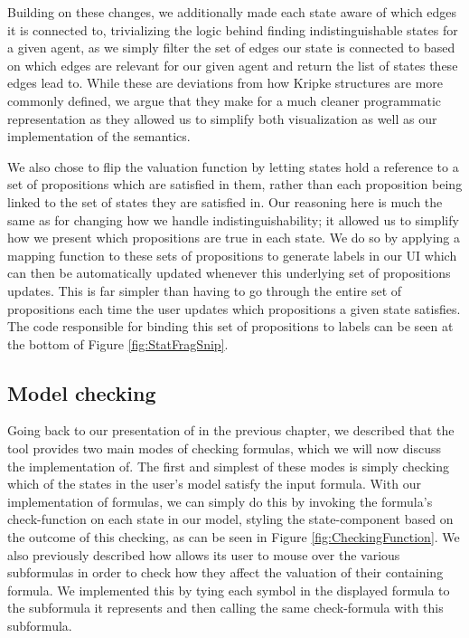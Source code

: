 Building on these changes, we additionally made each state aware of which edges it is connected to, trivializing the logic behind finding indistinguishable states for a given agent, as we simply filter the set of edges our state is connected to based on which edges are relevant for our given agent and return the list of states these edges lead to. While these are deviations from how Kripke structures are more commonly defined, we argue that they make for a much cleaner programmatic representation as they allowed us to simplify both visualization as well as our implementation of the semantics.

We also chose to flip the valuation function by letting states hold a reference to a set of propositions which are satisfied in them, rather than each proposition being linked to the set of states they are satisfied in. Our reasoning here is much the same as for changing how we handle indistinguishability; it allowed us to simplify how we present which propositions are true in each state. We do so by applying a mapping function to these sets of propositions to generate labels in our UI which can then be automatically updated whenever this underlying set of propositions updates. This is far simpler than having to go through the entire set of propositions each time the user updates which propositions a given state satisfies. The code responsible for binding this set of propositions to labels can be seen at the bottom of Figure \ref{fig:StatFragSnip}.


\subsection{Model checking}

Going back to our presentation of \cname{} in the previous chapter, we described that the tool provides two main modes of checking formulas, which we will now discuss the implementation of. The first and simplest of these modes is simply checking which of the states in the user's model satisfy the input formula. With our implementation of formulas, we can simply do this by invoking the formula's check-function on each state in our model, styling the state-component based on the outcome of this checking, as can be seen in Figure \ref{fig:CheckingFunction}. We also previously described how \cname{} allows its user to mouse over the various subformulas in order to check how they affect the valuation of their containing formula. We implemented this by tying each symbol in the displayed formula to the subformula it represents and then calling the same check-formula with this subformula.

